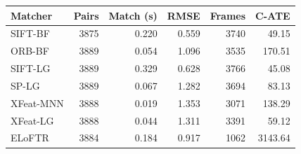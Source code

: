 \begin{tabular}{lrrrrr}
\toprule
Matcher & Pairs & Match (s) & RMSE & Frames & C-ATE \\
\midrule
SIFT-BF & 3875 & 0.220 & 0.559 & 3740 & 49.15 \\
ORB-BF & 3889 & 0.054 & 1.096 & 3535 & 170.51 \\
SIFT-LG & 3889 & 0.329 & 0.628 & 3766 & 45.08 \\
SP-LG & 3889 & 0.067 & 1.282 & 3694 & 83.13 \\
XFeat-MNN & 3888 & 0.019 & 1.353 & 3071 & 138.29 \\
XFeat-LG & 3888 & 0.044 & 1.311 & 3391 & 59.12 \\
ELoFTR & 3884 & 0.184 & 0.917 & 1062 & 3143.64 \\
\bottomrule
\end{tabular}
